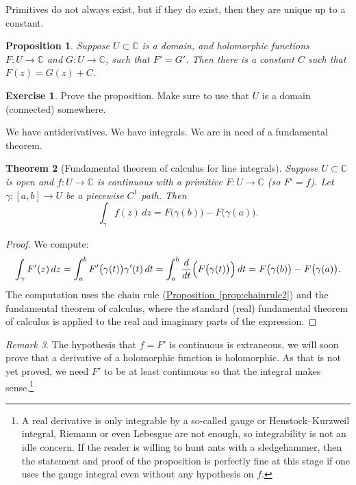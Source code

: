 \documentclass[12pt,openany]{book}
\newcommand{\C}{{\mathbb{C}}}
\theoremstyle{plain}
\newtheorem{thm}{Theorem}[section]
\newtheorem{prop}[thm]{Proposition}
\theoremstyle{remark}
\newtheorem{remark}[thm]{Remark}
\theoremstyle{definition}
\newenvironment{exbox}{%
    \def\FrameCommand{\vrule width 1pt \relax\hspace {10pt}}%
    \MakeFramed {\advance \hsize -\width \FrameRestore }%
}{%
    \endMakeFramed
}
\theoremstyle{exercise}
\newtheorem{exercise}{Exercise}[section]
\theoremstyle{example}
\newcommand{\propref}[1]{\hyperref[#1]{Proposition~\ref*{#1}}}
\begin{document}
Primitives do not always exist, but if they do exist, then they are unique up
to a constant.

\begin{prop} \label{prop:primunique}
Suppose $U \subset \C$ is a domain, and
holomorphic functions
$F \colon U \to \C$ and
$G \colon U \to \C$, such that $F' = G'$.  Then
there is a constant $C$ such that
$F(z) = G(z) + C$.
\end{prop}

\begin{exbox}
\begin{exercise}
Prove the proposition.
Make sure to use that $U$ is a domain (connected) somewhere.
\end{exercise}
\end{exbox}

We have antiderivatives.  We have integrals.  We are in need of a
fundamental theorem.

\begin{thm}[Fundamental theorem of calculus for line integrals]
%
Suppose $U \subset \C$ is open and $f \colon U \to \C$
is continuous with a primitive $F \colon U \to \C$ (so $F' = f$).
Let $\gamma \colon [a,b] \to U$ be a piecewise $C^1$ path.
Then
\begin{equation*}
\int_\gamma f(z) \, dz =
F\bigl( \gamma(b) \bigr) - F\bigl( \gamma(a)
\bigr) .
\end{equation*}
\end{thm}

\begin{proof}
We compute:
\begin{equation*}
\int_\gamma F'(z) \, dz
=
\int_a^b F'\bigl(\gamma(t)\bigr) \gamma'(t) \, dt 
=
\int_a^b \frac{d}{dt} \Bigl( F\bigl(\gamma(t)\bigr) \Bigr) \, dt 
=
F\bigl( \gamma(b) \bigr) - F\bigl( \gamma(a) \bigr) .
\end{equation*}
The computation uses the chain rule (\propref{prop:chainrule2})
and the fundamental theorem of calculus, where the
standard (real) fundamental theorem of calculus is applied to the real and imaginary parts
of the expression.
\end{proof}

\begin{remark}
The hypothesis that $f=F'$ is continuous is extraneous,
we will soon prove that a derivative of a holomorphic function is
holomorphic.  As that is not yet proved, we need $F'$ to be at least
continuous so that the integral makes sense.\footnote{%
A real derivative is only integrable
by a so-called gauge or Henstock--Kurzweil integral, Riemann or
even Lebesgue are not enough, so integrability is not an idle concern.
If the reader is willing to hunt ants with a sledgehammer, then
the statement and proof of the proposition is perfectly fine at this stage
if one uses the gauge integral even without any hypothesis on $f$.}
\end{remark}
\end{document}
